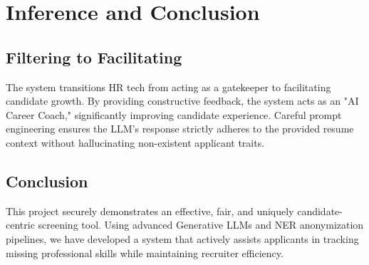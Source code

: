 \documentclass[12pt,a4paper]{article}
\begin{document}
\section{Inference and Conclusion}

\subsection{Filtering to Facilitating}
The system transitions HR tech from acting as a gatekeeper to facilitating candidate growth. By providing constructive feedback, the system acts as an "AI Career Coach," significantly improving candidate experience. Careful prompt engineering ensures the LLM's response strictly adheres to the provided resume context without hallucinating non-existent applicant traits.

\subsection{Conclusion}
This project securely demonstrates an effective, fair, and uniquely candidate-centric screening tool. Using advanced Generative LLMs and NER anonymization pipelines, we have developed a system that actively assists applicants in tracking missing professional skills while maintaining recruiter efficiency.
\end{document}
